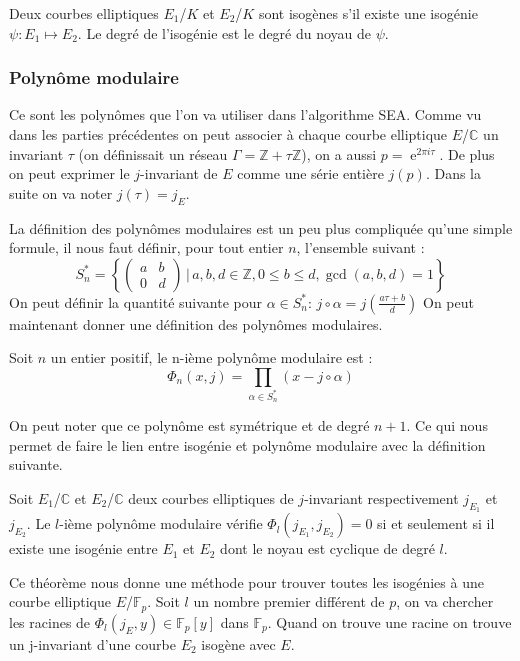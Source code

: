 \documentclass{article}
\DeclareMathOperator{\e}{e}
\begin{document}
Deux courbes elliptiques $E_1$/$K$ et $E_2$/$K$ sont isogènes s'il existe une isogénie $\psi : E_1 \mapsto E_2$. Le degré de l’isogénie est le degré du noyau de $\psi$.


\subsubsection{Polynôme modulaire}
Ce sont les polynômes que l'on va utiliser dans l'algorithme SEA. Comme vu dans les parties précédentes on peut associer à chaque courbe elliptique $E$/$\mathbb{C}$ un invariant $\tau$ (on définissait un réseau $\Gamma = \mathbb{Z}+\tau \mathbb{Z}$), on a aussi $p=\e^{2\pi i \tau}$. De plus on peut exprimer le $j$-invariant de $E$ comme une série entière $j(p)$. Dans la suite on va noter $j(\tau) = j_E$.

La définition des polynômes modulaires est un peu plus compliquée qu'une simple formule, il nous faut définir, pour tout entier $n$, l'ensemble suivant : 
\begin{equation*}
S_n^* = \left\{ \begin{pmatrix}
a & b\\
0 & d
\end{pmatrix}
\, | \, a,b,d \in \mathbb{Z}, 0 \leq b \leq d, \gcd(a,b,d) = 1
 \right\} 
\end{equation*}
On peut définir la quantité suivante pour $\alpha \in S_n^* $:  $j \circ \alpha = j(\frac{a\tau +b}{d})$
On peut maintenant donner une définition des polynômes modulaires.

\begin{defi}
Soit $n$ un entier positif, le n-ième polynôme modulaire est :
\begin{equation*}
\Phi_n(x,j) = \prod_{\alpha \in S_n^*} (x - j \circ \alpha)
\end{equation*}
\end{defi}
On peut noter que ce polynôme est symétrique et de degré $n+1$.
Ce qui nous permet de faire le lien entre isogénie et polynôme modulaire avec la définition suivante.
\begin{defi}
Soit $E_1$/$\mathbb{C}$ et $E_2$/$\mathbb{C}$ deux courbes elliptiques de $j$-invariant respectivement $j_{E_1}$ et $j_{E_2}$. Le $l$-ième polynôme modulaire vérifie $\Phi_l(j_{E_1},j_{E_2}) = 0$ si et seulement si il existe une isogénie entre $E_1$ et $E_2$ dont le noyau est cyclique de degré $l$.
\end{defi}

Ce théorème nous donne une méthode pour trouver toutes les isogénies à une courbe elliptique $E$/$\mathbb{F}_p$. Soit $l$ un nombre premier différent de $p$, on va chercher les racines de $\Phi_l(j_E, y) \in \mathbb{F}_p[y]$ dans $\mathbb{F}_p$. Quand on trouve une racine on trouve un j-invariant d'une courbe $E_2$ isogène avec $E$. 
\end{document}
